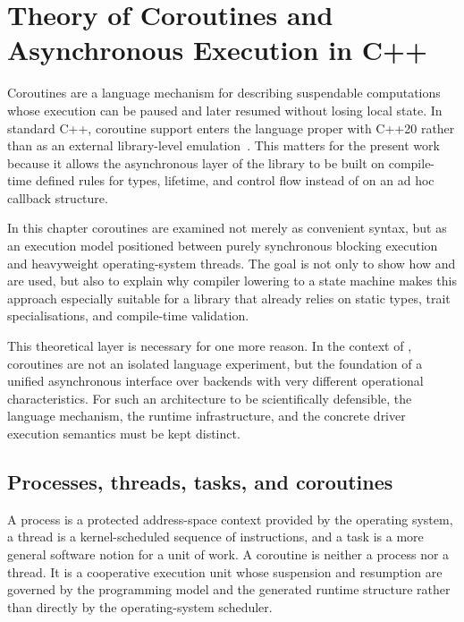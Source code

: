 \section{Theory of Coroutines and Asynchronous Execution in C++}
\label{sec:coroutines_async_theory}

Coroutines are a language mechanism for describing suspendable computations whose execution can be paused and later resumed without losing local state. In standard C++, coroutine support enters the language proper with C++20 rather than as an external library-level emulation~\cite{cpp20standard,p0912r5,p1063r0}. This matters for the present work because it allows the asynchronous layer of the library to be built on compile-time defined rules for types, lifetime, and control flow instead of on an ad hoc callback structure.

In this chapter coroutines are examined not merely as convenient syntax, but as an execution model positioned between purely synchronous blocking execution and heavyweight operating-system threads. The goal is not only to show how  and  are used, but also to explain why compiler lowering to a state machine makes this approach especially suitable for a library that already relies on static types, trait specialisations, and compile-time validation.

This theoretical layer is necessary for one more reason. In the context of \ORMName{}, coroutines are not an isolated language experiment, but the foundation of a unified asynchronous interface over backends with very different operational characteristics. For such an architecture to be scientifically defensible, the language mechanism, the runtime infrastructure, and the concrete driver execution semantics must be kept distinct.

\subsection{Processes, threads, tasks, and coroutines}

A process is a protected address-space context provided by the operating system, a thread is a kernel-scheduled sequence of instructions, and a task is a more general software notion for a unit of work. A coroutine is neither a process nor a thread. It is a cooperative execution unit whose suspension and resumption are governed by the programming model and the generated runtime structure rather than directly by the operating-system scheduler.

